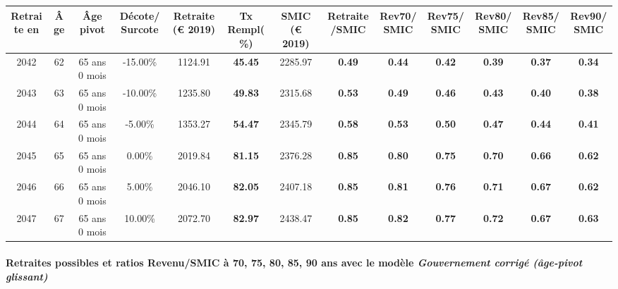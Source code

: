 { \scriptsize \begin{center} 
\begin{tabular}[htb]{|c|c||c|c||c|c||c||c|c|c|c|c|c|} 
\hline 
 Retraite en &  Âge &  Âge pivot &  Décote/Surcote &  Retraite (\euro{} 2019) &  Tx Rempl(\%) &  SMIC (\euro{} 2019) &  Retraite/SMIC &  Rev70/SMIC &  Rev75/SMIC &  Rev80/SMIC &  Rev85/SMIC &  Rev90/SMIC \\ 
\hline \hline 
 2042 &  62 &  65 ans 0 mois &  -15.00\% &  1124.91 &  {\bf 45.45} &  2285.97 &  {\bf {\color{red} 0.49}} &  {\bf {\color{red} 0.44}} &  {\bf {\color{red} 0.42}} &  {\bf {\color{red} 0.39}} &  {\bf {\color{red} 0.37}} &  {\bf {\color{red} 0.34}} \\ 
\hline 
 2043 &  63 &  65 ans 0 mois &  -10.00\% &  1235.80 &  {\bf 49.83} &  2315.68 &  {\bf {\color{red} 0.53}} &  {\bf {\color{red} 0.49}} &  {\bf {\color{red} 0.46}} &  {\bf {\color{red} 0.43}} &  {\bf {\color{red} 0.40}} &  {\bf {\color{red} 0.38}} \\ 
\hline 
 2044 &  64 &  65 ans 0 mois &  -5.00\% &  1353.27 &  {\bf 54.47} &  2345.79 &  {\bf {\color{red} 0.58}} &  {\bf {\color{red} 0.53}} &  {\bf {\color{red} 0.50}} &  {\bf {\color{red} 0.47}} &  {\bf {\color{red} 0.44}} &  {\bf {\color{red} 0.41}} \\ 
\hline 
 2045 &  65 &  65 ans 0 mois &  0.00\% &  2019.84 &  {\bf 81.15} &  2376.28 &  {\bf {\color{red} 0.85}} &  {\bf {\color{red} 0.80}} &  {\bf {\color{red} 0.75}} &  {\bf {\color{red} 0.70}} &  {\bf {\color{red} 0.66}} &  {\bf {\color{red} 0.62}} \\ 
\hline 
 2046 &  66 &  65 ans 0 mois &  5.00\% &  2046.10 &  {\bf 82.05} &  2407.18 &  {\bf {\color{red} 0.85}} &  {\bf {\color{red} 0.81}} &  {\bf {\color{red} 0.76}} &  {\bf {\color{red} 0.71}} &  {\bf {\color{red} 0.67}} &  {\bf {\color{red} 0.62}} \\ 
\hline 
 2047 &  67 &  65 ans 0 mois &  10.00\% &  2072.70 &  {\bf 82.97} &  2438.47 &  {\bf {\color{red} 0.85}} &  {\bf {\color{red} 0.82}} &  {\bf {\color{red} 0.77}} &  {\bf {\color{red} 0.72}} &  {\bf {\color{red} 0.67}} &  {\bf {\color{red} 0.63}} \\ 
\hline 
\hline 
\end{tabular} 
\end{center} } 
\paragraph{Retraites possibles et ratios Revenu/SMIC à 70, 75, 80, 85, 90 ans avec le modèle \emph{Gouvernement corrigé (âge-pivot glissant)}}  
 
